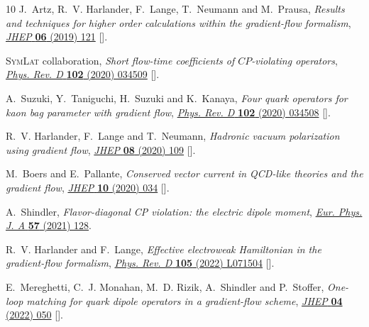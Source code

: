 \begin{thebibliography}{10}
J.~Artz, R.~V. Harlander, F.~Lange, T.~Neumann and M.~Prausa, \emph{{Results
  and techniques for higher order calculations within the gradient-flow
  formalism}}, \href{https://doi.org/10.1007/JHEP06(2019)121}{\emph{JHEP}
  {\bfseries 06} (2019) 121}
  [\href{https://arxiv.org/abs/1905.00882}{{}}].

{\scshape SymLat} collaboration, \emph{{Short flow-time coefficients of
  $CP$-violating operators}},
  \href{https://doi.org/10.1103/PhysRevD.102.034509}{\emph{Phys. Rev. D}
  {\bfseries 102} (2020) 034509}
  [\href{https://arxiv.org/abs/2005.04199}{{}}].

A.~Suzuki, Y.~Taniguchi, H.~Suzuki and K.~Kanaya, \emph{{Four quark operators
  for kaon bag parameter with gradient flow}},
  \href{https://doi.org/10.1103/PhysRevD.102.034508}{\emph{Phys. Rev. D}
  {\bfseries 102} (2020) 034508}
  [\href{https://arxiv.org/abs/2006.06999}{{}}].

R.~V. Harlander, F.~Lange and T.~Neumann, \emph{{Hadronic vacuum polarization
  using gradient flow}},
  \href{https://doi.org/10.1007/JHEP08(2020)109}{\emph{JHEP} {\bfseries 08}
  (2020) 109} [\href{https://arxiv.org/abs/2007.01057}{{}}].

M.~Boers and E.~Pallante, \emph{{Conserved vector current in QCD-like theories
  and the gradient flow}},
  \href{https://doi.org/10.1007/JHEP10(2020)034}{\emph{JHEP} {\bfseries 10}
  (2020) 034} [\href{https://arxiv.org/abs/2007.02121}{{}}].

A.~Shindler, \emph{{Flavor-diagonal CP violation: the electric dipole moment}},
  \href{https://doi.org/10.1140/epja/s10050-021-00421-y}{\emph{Eur. Phys. J. A}
  {\bfseries 57} (2021) 128}.

R.~V. Harlander and F.~Lange, \emph{{Effective electroweak Hamiltonian in the
  gradient-flow formalism}},
  \href{https://doi.org/10.1103/PhysRevD.105.L071504}{\emph{Phys. Rev. D}
  {\bfseries 105} (2022) L071504}
  [\href{https://arxiv.org/abs/2201.08618}{{}}].

E.~Mereghetti, C.~J. Monahan, M.~D. Rizik, A.~Shindler and P.~Stoffer,
  \emph{{One-loop matching for quark dipole operators in a gradient-flow
  scheme}}, \href{https://doi.org/10.1007/JHEP04(2022)050}{\emph{JHEP}
  {\bfseries 04} (2022) 050}
  [\href{https://arxiv.org/abs/2111.11449}{{}}].


\end{thebibliography}
